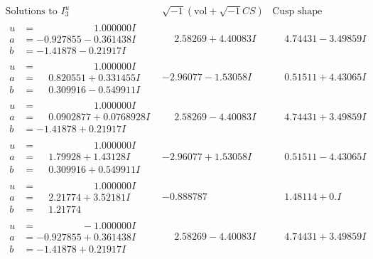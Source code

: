 \documentclass[1p]{elsarticle_modified}
\theoremstyle{definition}
\newcommand{\I}{\sqrt{-1}}
\begin{document}
$$\begin{array}{c|c|c}  
\text{Solutions to }I^u_{3}& \I (\text{vol} + \sqrt{-1}CS) & \text{Cusp shape}\\
 \hline 
\begin{aligned}
u &= \phantom{-0.000000 -}1.000000 I \\
a &= -0.927855 - 0.361438 I \\
b &= -1.41878 - 0.21917 I\end{aligned}
 & \phantom{-}2.58269 + 4.40083 I & \phantom{-}4.74431 - 3.49859 I \\ \hline\begin{aligned}
u &= \phantom{-0.000000 -}1.000000 I \\
a &= \phantom{-}0.820551 + 0.331455 I \\
b &= \phantom{-}0.309916 - 0.549911 I\end{aligned}
 & -2.96077 - 1.53058 I & \phantom{-}0.51511 + 4.43065 I \\ \hline\begin{aligned}
u &= \phantom{-0.000000 -}1.000000 I \\
a &= \phantom{-}0.0902877 + 0.0768928 I \\
b &= -1.41878 + 0.21917 I\end{aligned}
 & \phantom{-}2.58269 - 4.40083 I & \phantom{-}4.74431 + 3.49859 I \\ \hline\begin{aligned}
u &= \phantom{-0.000000 -}1.000000 I \\
a &= \phantom{-}1.79928 + 1.43128 I \\
b &= \phantom{-}0.309916 + 0.549911 I\end{aligned}
 & -2.96077 + 1.53058 I & \phantom{-}0.51511 - 4.43065 I \\ \hline\begin{aligned}
u &= \phantom{-0.000000 -}1.000000 I \\
a &= \phantom{-}2.21774 + 3.52181 I \\
b &= \phantom{-}1.21774\phantom{ +0.000000I}\end{aligned}
 & -0.888787\phantom{ +0.000000I} & \phantom{-}1.48114 + 0. I\phantom{ +0.000000I} \\ \hline\begin{aligned}
u &= \phantom{-0.000000 } -1.000000 I \\
a &= -0.927855 + 0.361438 I \\
b &= -1.41878 + 0.21917 I\end{aligned}
 & \phantom{-}2.58269 - 4.40083 I & \phantom{-}4.74431 + 3.49859 I \\ \hline\begin{aligned}

\end{aligned}
\end{array}$$
\end{document}
